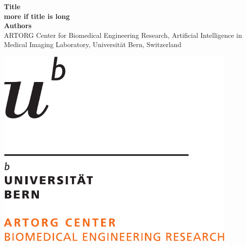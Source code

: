 \documentclass[a0,portrait]{a0poster}
\numberwithin{equation}{section}
\begin{document}


\begin{minipage}[b]{0.8\linewidth} %
\veryHuge \color{NavyBlue} \textbf{Title \\ more if title is long} \color{Black}\\[2cm] %
\huge \textbf{Authors}\\[0.5cm] %
\small ARTORG Center for Biomedical Engineering Research, Artificial Intelligence in Medical Imaging Laboratory, Universit\"{a}t Bern, Switzerland %
\end{minipage}
\begin{minipage}[b]{0.2\linewidth}
	\includegraphics[width=12cm]{logos/unibe}
\end{minipage}
\end{document}
